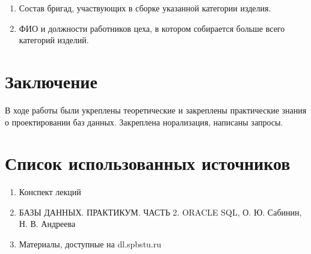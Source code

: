 \begin{enumerate}
    

    \item Состав бригад, участвующих в сборке указанной категории изделия.

    

    \item ФИО и должности работников цеха, в котором собирается больше всего категорий изделий.

    

\end{enumerate}

\section{Заключение}
В ходе работы были укреплены теоретические и закреплены практические знания о проектировании баз данных.
Закреплена норализация, написаны запросы.

\section{Список использованных источников}

\begin{enumerate}

    \item Конспект лекций
    \item БАЗЫ ДАННЫХ. ПРАКТИКУМ. ЧАСТЬ 2. ORACLE SQL, О. Ю. Сабинин, Н. В. Андреева
    \item Материалы, доступные на dl.spbstu.ru

\end{enumerate}

